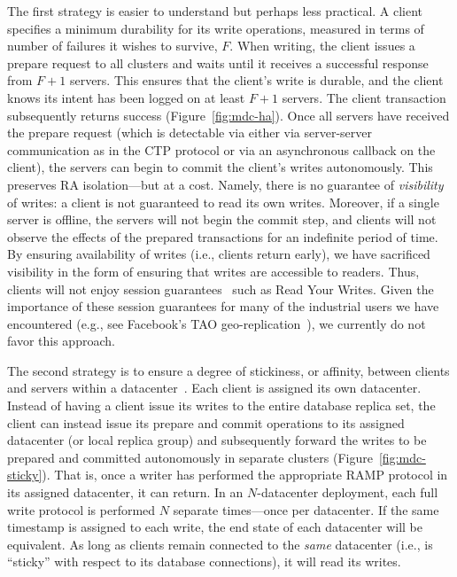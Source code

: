  The first strategy is easier to understand but perhaps less practical. A client specifies a minimum durability for its write operations, measured in terms of number of failures it wishes to survive, $F$. When writing, the client issues a prepare request to all clusters and waits until it receives a successful response from $F+1$ servers. This ensures that the client's write is durable, and the client knows its intent has been logged on at least $F+1$ servers. The client transaction subsequently returns success (Figure~\ref{fig:mdc-ha}). Once all servers have received the prepare request (which is detectable via either via server-server communication as in the CTP protocol or via an asynchronous callback on the client), the servers can begin to commit the client's writes autonomously. This preserves RA isolation---but at a cost. Namely, there is no guarantee of \textit{visibility} of writes: a client is not guaranteed to read its own writes. Moreover, if a single server is offline, the servers will not begin the commit step, and clients will not observe the effects of the prepared transactions for an indefinite period of time. By ensuring availability of writes (i.e., clients return early), we have sacrificed visibility in the form of ensuring that writes are accessible to readers. Thus, clients will not enjoy session guarantees~\cite{sessionguarantees} such as Read Your Writes. Given the importance of these session guarantees for many of the industrial users we have encountered (e.g., see Facebook's TAO geo-replication~\cite{tao}), we currently do not favor this approach.

 The second strategy is to ensure a degree of stickiness, or affinity, between clients and servers within a datacenter~\cite{hat-vldb}.  Each client is assigned its own datacenter.  Instead of having a client issue its writes to the entire database replica set, the client can instead issue its prepare and commit operations to its assigned datacenter (or local replica group) and subsequently forward the writes to be prepared and committed autonomously in separate clusters (Figure~\ref{fig:mdc-sticky}). That is, once a writer has performed the appropriate RAMP protocol in its assigned datacenter, it can return.  In an $N$-datacenter deployment, each full write protocol is performed $N$ separate times---once per datacenter. If the same timestamp is assigned to each write, the end state of each datacenter will be equivalent. As long as clients remain connected to the \textit{same} datacenter (i.e., is ``sticky'' with respect to its database connections), it will read its writes.

